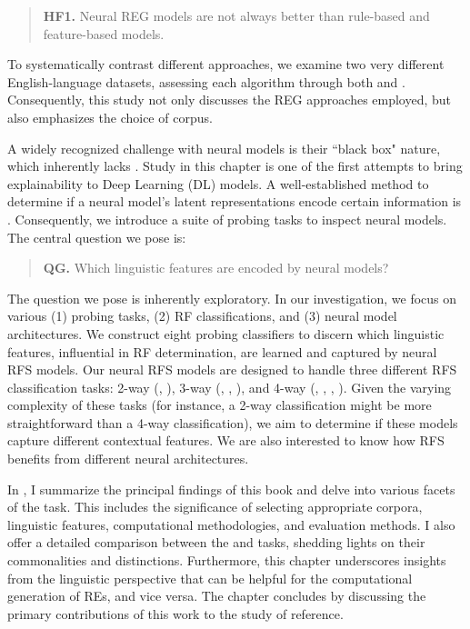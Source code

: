 \begin{quote}
	\textbf{HF1.} Neural REG models are not always better than rule-based and feature-based models.
\end{quote}

To systematically contrast different \context approaches, we examine two very different English-language datasets, assessing each algorithm through both  and . Consequently, this study not only discusses the REG approaches employed, but also emphasizes the choice of corpus.

A widely recognized challenge with neural models is their ``black box" nature, which inherently lacks . Study \studG in this chapter is one of the first attempts to bring explainability to Deep Learning (DL) \context models. 
A well-established method to determine if a neural model's latent representations encode certain information is . Consequently, we introduce a suite of probing tasks to inspect neural \context models. The central question we pose is:

\begin{quote}
	\textbf{QG.} Which linguistic features are encoded by neural models?
\end{quote}

The question we pose is inherently exploratory. In our investigation, we focus on various (1) probing tasks, (2) RF classifications, and (3) neural model architectures. We construct eight probing classifiers to discern which linguistic features, influential in RF determination, are learned and captured by neural RFS models. Our neural RFS models are designed to handle three different RFS classification tasks: 2-way (, ), 3-way (, ,  ), and 4-way (, , ,  ). Given the varying complexity of these tasks (for instance, a 2-way classification might be more straightforward than a 4-way classification), we aim to determine if these models capture different contextual features.
We are also interested to know how RFS benefits from different neural architectures.


In , I summarize the principal findings of this book and delve into various facets of the \context task. This includes the significance of selecting appropriate corpora, linguistic features, computational methodologies, and evaluation methods. I also offer a detailed comparison between the \shot and \context tasks, shedding lights on their commonalities and distinctions. Furthermore, this chapter underscores insights from the linguistic perspective that can be helpful for the computational generation of REs, and vice versa. The chapter concludes by discussing the primary contributions of this work to the study of reference.
